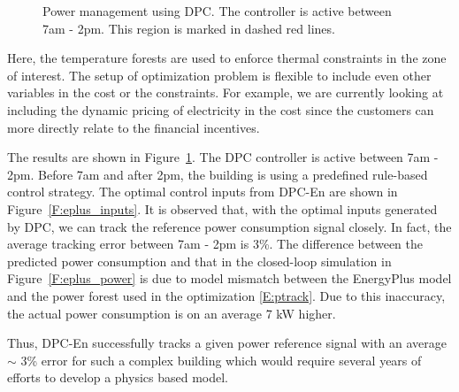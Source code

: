 \begin{figure}[h!]
	\begin{center}
\end{center}
	\caption{Power management using DPC. The controller is active between 7am - 2pm. This region is marked in dashed red lines.}
	\captionsetup{justification=centering}
	\label{F:eplus_track}
\end{figure}

Here, the temperature forests are used to enforce thermal constraints in the zone of interest. The setup of optimization problem is flexible to include even other variables in the cost or the constraints. For example, we are currently looking at including the dynamic pricing of electricity in the cost since the customers can more directly relate to the financial incentives.

The results are shown in Figure~\ref{F:eplus_track}. 
The DPC controller is active between 7am - 2pm. Before 7am and after 2pm, the building is using a predefined rule-based control strategy.
The optimal control inputs from DPC-En are shown in Figure~\ref{F:eplus_inputs}. It is observed that, with the optimal inputs generated by DPC, we can track the reference power consumption signal closely. In fact, the average tracking error between 7am - 2pm is 3\%. The difference between the predicted power consumption and that in the closed-loop simulation in Figure~\ref{F:eplus_power} is due to model mismatch between the EnergyPlus model and the power forest used in the optimization \eqref{E:ptrack}. Due to this inaccuracy, the actual power consumption is on an average 7 kW higher.

Thus, DPC-En successfully tracks a given power reference signal with an average $\sim$ 3\% error for such a complex building which would require several years of efforts to develop a physics based model.

